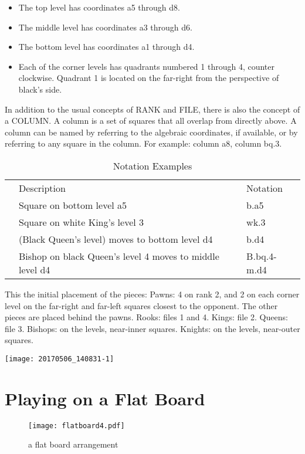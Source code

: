 \documentclass[12pt]{article} %
\begin{document}
\begin{itemize}
\item The top level has coordinates a5 through d8.
\item The middle level has coordinates a3 through d6.
\item The bottom level has coordinates a1 through d4.
\item Each of the corner levels has quadrants numbered 1 through 4, counter clockwise. Quadrant 1 is located on the far-right from the perspective of black's side.
\end{itemize}

In addition to the usual concepts of RANK and FILE, there is also the concept of a COLUMN.  A column is a set of squares that all overlap from directly above.  A column can be named by referring to the algebraic coordinates, if available, or by referring to any square in the column.  For example: column a8, column bq.3.

\begin{table}[H]
\caption{Notation Examples}
\label{notation}
\begin{tabular}{lll}
 & Description & Notation \\
 & Square on bottom level a5 & b.a5 \\
 & Square on white King's level 3 & wk.3 \\
 & (Black Queen's level) moves to bottom level d4 & b.d4 \\
 & Bishop on black Queen's level 4 moves to middle level d4  & B.bq.4-m.d4 \\
\end{tabular}
\end{table}

This the initial placement of the pieces:
Pawns:  4 on rank 2, and 2 on each corner level on the far-right and far-left squares closest to the opponent.  The other pieces are placed behind the pawns.
Rooks: files 1 and 4.
Kings: file 2.
Queens: file 3.
Bishops: on the levels, near-inner squares.
Knights: on the levels, near-outer squares.

\begin{center}
\texttt{[image: 20170506\_140831-1]}
\end{center}

\section{Playing on a Flat Board}

\begin{wrapfigure}[27]{l}{0.5\textwidth} %
\begin{center}
\texttt{[image: flatboard4.pdf]}
\end{center}
\caption{a flat board arrangement}
\label{flatboard}
\end{wrapfigure}
\end{document}
